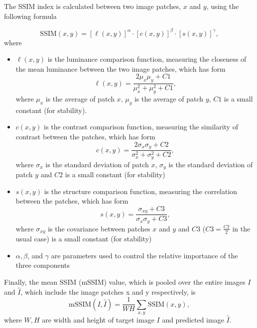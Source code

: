 The SSIM index is calculated between two image patches, $x$ and $y$, using the following formula

\begin{equation}
    \text{SSIM}(x, y) = [\ell(x, y)]^\alpha \cdot [c(x, y)]^\beta \cdot [s(x, y)]^\gamma,
\end{equation}
where
\begin{itemize}
    \item $\ell(x, y)$ is the luminance comparison function, measuring the closeness of the mean luminance between the two image patches, which has form
          \begin{equation*}
              \ell(x, y) = \frac{2 \mu_x \mu_y + C1}{\mu_x^2 + \mu_y^2 + C1},
          \end{equation*}
          where $\mu_x$ is the average of patch $x$, $\mu_y$ is the average of patch $y$, $C1$ is a small constant (for stability).
    \item  $c(x, y)$ is the contrast comparison function, measuring the similarity of contrast between the patches, which has form
          \begin{equation*}
              c(x, y) = \frac{2 \sigma_x \sigma_y + C2}{\sigma_x^2 + \sigma_y^2 + C2},
          \end{equation*}
          where $\sigma_x$ is the standard deviation of patch $x$, $\sigma_y$ is the standard deviation of patch $y$ and $C2$ is a small constant (for stability)
    \item $s(x, y)$ is the structure comparison function, measuring the correlation between the patches, which has form
          \begin{equation*}
              s(x, y) = \frac{\sigma_{xy} + C3}{\sigma_x \sigma_y + C3},
          \end{equation*}
          where $\sigma_{xy}$ is the covariance between patches $x$ and $y$ and $C3$ ($C3=\frac{C2}{2}$ in the usual case) is a small constant (for stability)
    \item $\alpha, \beta$, and $\gamma$ are parameters used to control the relative importance of the three components
\end{itemize}
Finally, the mean SSIM (mSSIM) value, which is pooled over the entire images $I$ and $\hat{I}$, which include the image patches x and y respectively, is  
\begin{equation}
    \text{mSSIM}(I, \hat{I}) = \frac{1}{WH} \sum \limits_{x,y} \text{SSIM}(x,y), 
\end{equation}
where $W,H$ are width and height of target image $I$ and predicted image $\hat{I}$.

